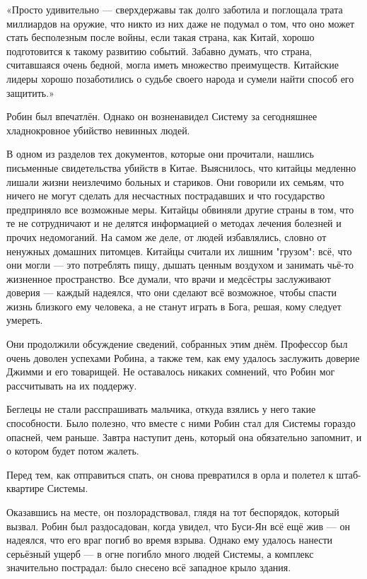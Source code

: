 \documentclass[a4paper,12pt]{book}
\begin{document}
«Просто удивительно — сверхдержавы так долго заботила и поглощала трата миллиардов на оружие, что никто из них даже не подумал о том, что оно может стать бесполезным после войны, если такая страна, как Китай, хорошо подготовится к такому развитию событий. Забавно думать, что страна, считавшаяся очень бедной, могла иметь множество преимуществ. Китайские лидеры хорошо позаботились о судьбе своего народа и сумели найти способ его защитить.»
\par
Робин был впечатлён. Однако он возненавидел Систему за сегодняшнее хладнокровное убийство невинных людей.\\
\par
В одном из разделов тех документов, которые они прочитали, нашлись письменные свидетельства убийств в Китае. Выяснилось, что китайцы медленно лишали жизни неизлечимо больных и стариков. Они говорили их семьям, что ничего не могут сделать для несчастных пострадавших и что государство предприняло все возможные меры. Китайцы обвиняли другие страны в том, что те не сотрудничают и не делятся информацией о методах лечения болезней и прочих недомоганий. На самом же деле, от людей избавлялись, словно от ненужных домашних питомцев. Китайцы считали их лишним "грузом": всё, что они могли — это потреблять пищу, дышать ценным воздухом и занимать чьё-то жизненное пространство. Все думали, что врачи и медсёстры заслуживают доверия — каждый надеялся, что они сделают всё возможное, чтобы спасти жизнь близкого ему человека, а не станут играть в Бога, решая, кому следует умереть.\\
\par
Они продолжили обсуждение сведений, собранных этим днём. Профессор был очень доволен успехами Робина, а также тем, как ему удалось заслужить доверие Джимми и его товарищей. Не оставалось никаких сомнений, что Робин мог рассчитывать на их поддержу.
\par
Беглецы не стали расспрашивать мальчика, откуда взялись у него такие способности. Было полезно, что вместе с ними Робин стал для Системы гораздо опасней, чем раньше. Завтра наступит день, который она обязательно запомнит, и о котором будет потом жалеть.
\par
Перед тем, как отправиться спать, он снова превратился в орла и полетел к штаб-квартире Системы.
\par
Оказавшись на месте, он позлорадствовал, глядя на тот беспорядок, который вызвал. Робин был раздосадован, когда увидел, что Буси-Ян всё ещё жив — он надеялся, что его враг погиб во время взрыва. Однако ему удалось нанести серьёзный ущерб — в огне погибло много людей Системы, а комплекс значительно пострадал: было снесено всё западное крыло здания.
\end{document}
